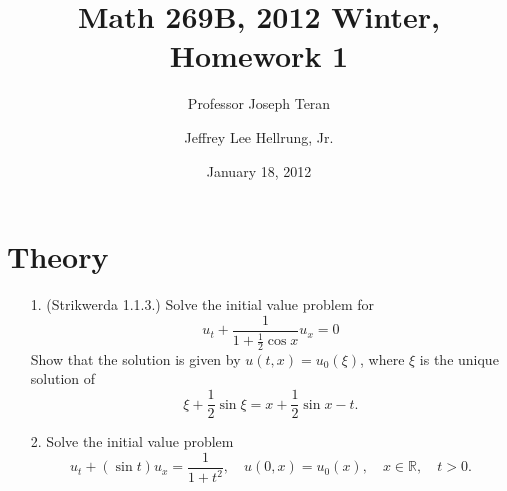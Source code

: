 \documentclass{article}
\begin{document}
\title{Math 269B, 2012 Winter, Homework 1}
\date{January 18, 2012}
\author{Professor Joseph Teran \and Jeffrey Lee Hellrung, Jr.}
\maketitle

\section{Theory}

\begin{itemize}

\item[1.] (Strikwerda 1.1.3.) Solve the initial value problem for
\begin{equation*}
u_t + \frac{1}{1 + \frac{1}{2} \cos x} u_x = 0
\end{equation*}
Show that the solution is given by $u(t,x) = u_0(\xi)$, where $\xi$ is the unique solution of
\begin{equation*}
\xi + \frac{1}{2} \sin \xi = x + \frac{1}{2} \sin x - t.
\end{equation*}

\item[2.] Solve the initial value problem
\begin{equation*}
u_t + \left( \sin t \right) u_x = \frac{1}{1 + t^2}, \quad u(0,x) = u_0(x), \quad x \in \mathbb{R}, \quad t > 0.
\end{equation*}


\end{itemize}
\end{document}
